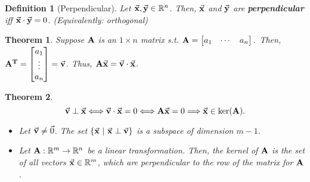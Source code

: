 \documentclass[12pt, a4paper]{article}
\newtheorem{thm}{Theorem}[subsection]
\newtheorem{df}{Definition}[subsection]
\def\R{{\mathbb{R}}}
\def\T{{\vb{T}}}
\def\vecx{\va{x}}
\def\vecy{\va{y}}
\def\vecv{\va{v}}
\def\matrixA{\vb{A}}
\begin{document}
\begin{df}[Perpendicular]
	Let $\vecx,\vecy\in\R^n$. Then, $\vecx$ and $\vecy$ are \textbf{perpendicular} \emph{iff} $\vecx\cdot\vecy=0$. (Equivalently: orthogonal)	
\end{df}
\begin{thm}
	Suppose $\matrixA$ is an $1\times n$ matrix \emph{s.t.} $\matrixA=\begin{bmatrix}a_1&\cdots&a_n\end{bmatrix}.$ Then, $\matrixA^\T=\begin{bmatrix}a_1\\\vdots\\a_n\end{bmatrix}=\vecv$. Thus, 	$\matrixA\vecx=\vecv\cdot\vecx$.
\end{thm}
\begin{thm}
	\[\vecv\perp\vecx\Longleftrightarrow\vecv\cdot\vecx=0\Longleftrightarrow\matrixA\vecx=0\Longrightarrow\vecx\in\ker(\matrixA).\]	
	\begin{itemize}
		\item Let $\vecv\neq\vec{0}$. The set $\{\vecx\ |\ \vecx\perp\vecv\}$ is a subspace of dimension $m-1$.
		\item Let $\matrixA: \R^m\to\R^n$ be a linear transformation. Then, the kernel of $\matrixA$ is the set of all vectors $\vecx\in\R^m$, which are perpendicular to the row of the matrix for $\matrixA$.
	\end{itemize}
\end{thm}
\end{document}
